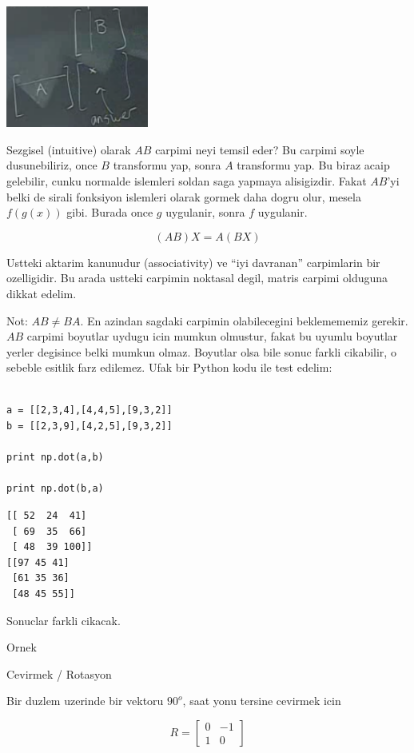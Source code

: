 \documentclass[12pt,fleqn]{article}\usepackage{../common}
\begin{document}
\includegraphics[height=4cm]{3_4.png}

Sezgisel (intuitive) olarak $AB$ carpimi neyi temsil eder? Bu carpimi soyle
dusunebiliriz, once $B$ transformu yap, sonra $A$ transformu yap. Bu biraz
acaip gelebilir, cunku normalde islemleri soldan saga yapmaya
alisigizdir. Fakat $AB$'yi belki de sirali fonksiyon islemleri olarak
gormek daha dogru olur, mesela $f(g(x))$ gibi. Burada once $g$ uygulanir,
sonra $f$ uygulanir. 

\[ (AB)X = A(BX) \]

Ustteki aktarim kanunudur (associativity) ve ``iyi davranan'' carpimlarin
bir ozelligidir. Bu arada ustteki carpimin noktasal degil, matris carpimi
olduguna dikkat edelim. 

Not: $AB \ne BA$. En azindan sagdaki carpimin olabilecegini beklemememiz
gerekir. $AB$ carpimi boyutlar uydugu icin mumkun olmustur, fakat bu uyumlu
boyutlar yerler degisince belki mumkun olmaz. Boyutlar olsa bile sonuc
farkli cikabilir, o sebeble esitlik farz edilemez. Ufak bir Python kodu ile
test edelim:

\begin{verbatim}

a = [[2,3,4],[4,4,5],[9,3,2]]
b = [[2,3,9],[4,2,5],[9,3,2]]

print np.dot(a,b)

print np.dot(b,a)
\end{verbatim}

\begin{verbatim}
[[ 52  24  41]
 [ 69  35  66]
 [ 48  39 100]]
[[97 45 41]
 [61 35 36]
 [48 45 55]]
\end{verbatim}

Sonuclar farkli cikacak. 

Ornek

Cevirmek / Rotasyon

Bir duzlem uzerinde bir vektoru $90^o$, saat yonu tersine cevirmek icin 

\[ R =
\left[\begin{array}{rr}
0 & -1 \\
1 & 0
\end{array}\right]
 \]
\end{document}
